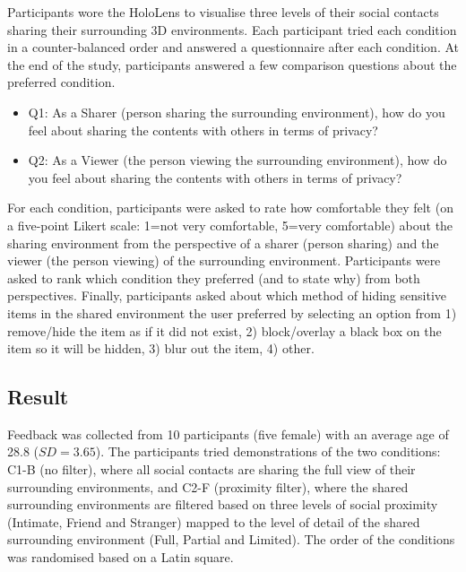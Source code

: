 Participants wore the HoloLens to visualise three levels of their social contacts sharing their surrounding 3D environments. Each participant tried each condition in a counter-balanced order and answered a questionnaire after each condition. At the end of the study, participants answered a few comparison questions about the preferred condition. 

\begin{itemize}
    \item Q1: As a Sharer (person sharing the surrounding environment), how do you feel about sharing the contents with others in terms of privacy? 
    \item Q2: As a Viewer (the person viewing the surrounding environment), how do you feel about sharing the contents with others in terms of privacy? 
\end{itemize}

For each condition, participants were asked to rate how comfortable they felt (on a five-point Likert scale: 1=not very comfortable, 5=very comfortable) about the sharing environment from the perspective of a sharer (person sharing) and the viewer (the person viewing) of the surrounding environment. Participants were asked to rank which condition they preferred (and to state why) from both perspectives. Finally, participants asked about which method of hiding sensitive items in the shared environment the user preferred by selecting an option from 1) remove/hide the item as if it did not exist, 2) block/overlay a black box on the item so it will be hidden, 3) blur out the item, 4) other. 

\subsection{Result}

Feedback was collected from 10 participants (five female) with an average age of 28.8 ($SD=3.65$). The participants tried demonstrations of the two conditions: C1-B (no filter), where all social contacts are sharing the full view of their surrounding environments, and C2-F (proximity filter), where the shared surrounding environments are filtered based on three levels of social proximity (Intimate, Friend and Stranger) mapped to the level of detail of the shared surrounding environment (Full, Partial and Limited). The order of the conditions was randomised based on a Latin square. 

